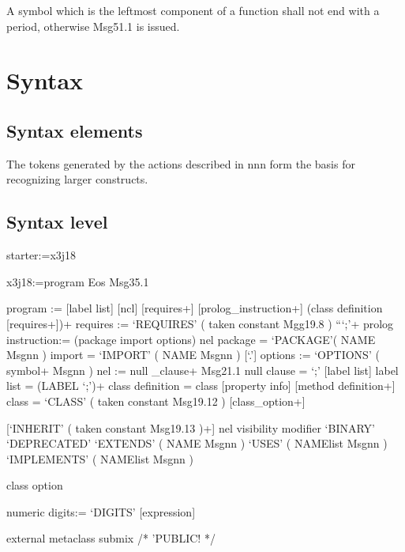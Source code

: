 A symbol which is the leftmost component of a function shall not end
with a period, otherwise Msg51.1 is issued.

\hypertarget{syntax}{%
\section{Syntax}\label{syntax}}

\hypertarget{syntax-elements}{%
\subsection{Syntax elements}\label{syntax-elements}}

The tokens generated by the actions described in nnn form the basis for
recognizing larger constructs.

\hypertarget{syntax-level}{%
\subsection{Syntax level}\label{syntax-level}}

starter:=x3j18

x3j18:=program Eos \textbar{} Msg35.1

program := {[}label list{]} {[}ncl{]} {[}requires+{]}
{[}prolog\_instruction+{]} (class definition {[}requires+{]})+ requires
:= `REQUIRES' ( taken constant \textbar{} Mgg19.8 ) ```;'+ prolog
instruction:= (package \textbar{} import \textbar{} options) nel package
= `PACKAGE'( NAME \textbar{} Msgnn ) import = `IMPORT' ( NAME \textbar{}
Msgnn ) {[}`.'{]} options := `OPTIONS' ( symbol+ \textbar{} Msgnn ) nel
:= null \_clause+ \textbar{} Msg21.1 null clause = `;' {[}label list{]}
label list = (LABEL `;')+ class definition = class {[}property info{]}
{[}method definition+{]} class = `CLASS' ( taken constant \textbar{}
Msg19.12 ) {[}class\_option+{]}

{[}`INHERIT' ( taken constant \textbar{} Msg19.13 )+{]} nel visibility
\textbar{} modifier \textbar{} `BINARY' \textbar{} `DEPRECATED'
`EXTENDS' ( NAME \textbar{} Msgnn ) `USES' ( NAMElist \textbar{} Msgnn )
\textbar{} `IMPLEMENTS' ( NAMElist \textbar{} Msgnn )

class option

numeric digits:= `DIGITS' {[}expression{]}

external \textbar{} metaclass \textbar{} submix /* \textbar{} 'PUBLIC!
*/

